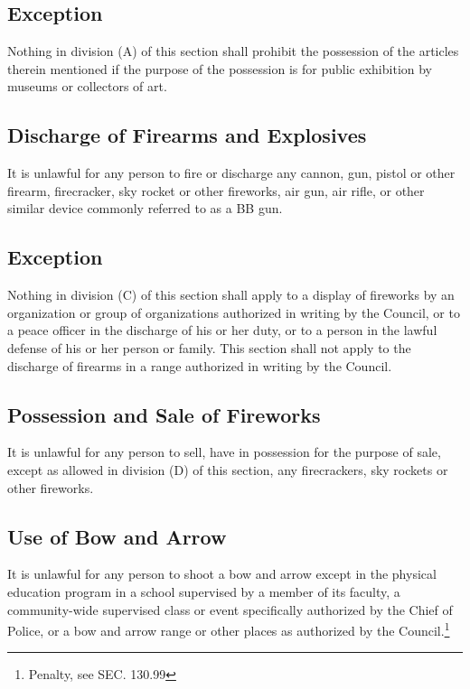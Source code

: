 \subsection{Exception}
Nothing in division (A) of this section shall prohibit the possession of the articles therein mentioned if the purpose of the possession is for public exhibition by museums or collectors of art.
\subsection{Discharge of Firearms and Explosives}
It is unlawful for any person to fire or discharge any cannon, gun, pistol or other firearm, firecracker, sky rocket or other fireworks, air gun, air rifle, or other similar device commonly referred to as a BB gun.
\subsection{Exception}
Nothing in division (C) of this section shall apply to a display of fireworks by an organization or group of organizations authorized in writing by the Council, or to a peace officer in the discharge of his or her duty, or to a person in the lawful defense of his or her person or family.  This section shall not apply to the discharge of firearms in a range authorized in writing by the Council.
\subsection{Possession and Sale of Fireworks}
It is unlawful for any person to sell, have in possession for the purpose of sale, except as allowed in division (D) of this section, any firecrackers, sky rockets or other fireworks.
\subsection{Use of Bow and Arrow}
It is unlawful for any person to shoot a bow and arrow except in the physical education program in a school supervised by a member of its faculty, a community-wide supervised class or event specifically authorized by the Chief of Police, or a bow and arrow range or other places as authorized by the Council.\footnote{Penalty, see SEC. 130.99}

